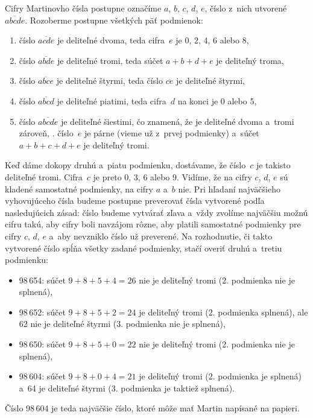 {%
Cifry Martinovho čísla postupne označíme $a$, $b$, $c$, $d$, $e$, číslo
z~nich utvorené $\overline{abcde}$. Rozoberme postupne všetkých päť podmienok:
\begin{enumerate}
  \item  číslo $\overline{acde}$ je deliteľné dvoma, teda
    cifra~$e$ je 0, 2, 4, 6 alebo 8,
  \item  číslo $\overline{abde}$ je deliteľné tromi, teda súčet $a + b + d + e$ je deliteľný troma,
  \item  číslo $\overline{abce}$ je deliteľné štyrmi, teda číslo
    $\overline{ce}$ je deliteľné štyrmi,
  \item  číslo $\overline{abcd}$ je deliteľné piatimi, teda cifra~$d$ na konci
    je 0 alebo 5,
  \item  číslo $\overline{abcde}$ je deliteľné šiestimi, čo znamená,
    že je deliteľné dvoma a~tromi zároveň, \tj. číslo~$e$ je párne (vieme už z~prvej podmienky)
    a~súčet $a + b + c + d + e$ je deliteľný tromi.
\end{enumerate}
Keď dáme dokopy druhú a~piatu podmienku, dostávame, že číslo~$c$ je takisto
deliteľné tromi. Cifra~$c$ je preto 0, 3, 6 alebo 9.
Vidíme, že na cifry $c$, $d$, $e$ sú kladené samostatné podmienky,
na cifry $a$ a~$b$ nie.
Pri hľadaní najväčšieho vyhovujúceho čísla budeme postupne preverovať čísla
vytvorené podľa nasledujúcich zásad: číslo budeme vytvárať zľava a~vždy
zvolíme najväčšiu možnú cifru takú, aby cifry boli navzájom rôzne,
aby platili samostatné podmienky pre cifry $c$, $d$, $e$ a~aby nevzniklo číslo
už preverené. Na rozhodnutie, či takto vytvorené číslo spĺňa všetky
zadané podmienky, stačí overiť druhú a~tretiu podmienku:
\begin{itemize}
  \item 98\,654:  súčet $9 + 8 + 5 + 4 = 26$ nie je deliteľný tromi (2. podmienka nie je splnená),
  \item 98\,652:  súčet $9 + 8 + 5 + 2 = 24$ je deliteľný tromi (2. podmienka splnená), ale 62 nie je deliteľné štyrmi (3. podmienka nie je splnená),
  \item 98\,650: súčet $9 + 8 + 5 + 0 = 22$ nie je deliteľný tromi (2. podmienka nie je splnená),
  \item 98\,604: súčet $9 + 8 + 0 +4 = 21$ je deliteľný tromi (2. podmienka je splnená) a~64 je deliteľné štyrmi (3. podmienka je taktiež splnená).
\end{itemize}
Číslo 98\,604 je teda najväčšie číslo, ktoré môže mať Martin napísané na papieri.
}

